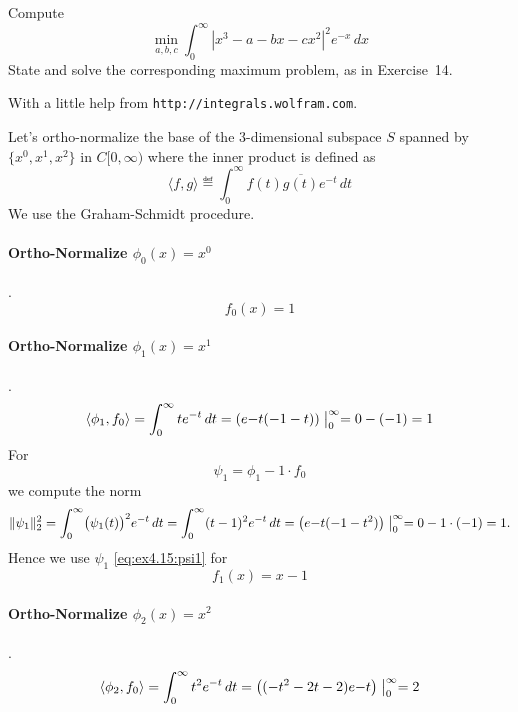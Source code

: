 \begin{enumerate}
\begin{excopy}
Compute
\begin{equation*}
 \min_{a,b,c} \int_0^\infty |x^3 - a - bx -cx^2|^2e^{-x} \,dx
\end{equation*}
State and solve the corresponding maximum problem,
as in Exercise~14.
\end{excopy}

With a little help from \texttt{http://integrals.wolfram.com}.

Let's ortho-normalize the base of the $3$-dimensional subspace $S$
spanned by \(\{x^0, x^1, x^2\}\) in \(C[0,\infty)\)
where the inner product is defined as
\begin{equation*}
\langle f,g \rangle \eqdef \int_0^\infty f(t)\overline{g(t)}e^{-t}\,dt
\end{equation*}
We use the Graham-Schmidt procedure.

\paragraph{Ortho-Normalize \(\phi_0(x)=x^0\)}.
\begin{equation*}
f_0(x) = 1
\end{equation*}

\paragraph{Ortho-Normalize \(\phi_1(x)=x^1\)}.
\begin{equation*}
\langle \phi_1, f_0 \rangle
 = \int_0^\infty t e^{-t}\,dt
 = \left(e{-t}(-1-t)\right)\bigm|_0^\infty
 = 0 - (-1) = 1
\end{equation*}
For
\begin{equation} \label{eq:ex4.15:psi1}
\psi_1 = \phi_1 - 1\cdot f_0
\end{equation}
we compute the norm
\begin{equation*}
\|\psi_1\|_2^2
 = \int_0^\infty \bigl(\psi_1(t)\bigr)^2 e^{-t}\,dt
 = \int_0^\infty (t - 1)^2 e^{-t}\,dt
 =  \left(e{-t}(-1-t^2)\right)\bigm|_0^\infty
 = 0 - 1\cdot (-1) = 1.
\end{equation*}
Hence we use \(\psi_1\) \eqref{eq:ex4.15:psi1} for
\begin{equation*}
f_1(x) = x - 1
\end{equation*}

\paragraph{Ortho-Normalize \(\phi_2(x)=x^2\)}.
\begin{equation*}
\langle \phi_2, f_0 \rangle
 = \int_0^\infty t^2 e^{-t}\,dt
 = \left((-t^2-2t-2)e{-t}\right)\bigm|_0^\infty
 = 2
\end{equation*}


\end{enumerate}

